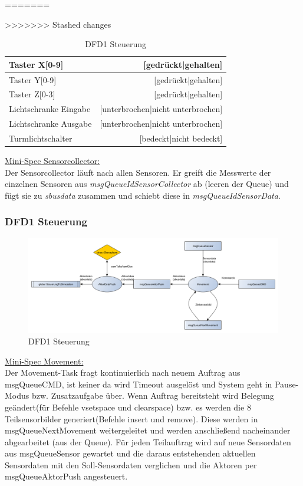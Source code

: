 \begin{table}[h]
=======
\begin{table}[H]
>>>>>>> Stashed changes
\centering
\begin{tabular}{|l|r|}
\hline
Taster X[0-9] &  [gedrückt|gehalten] \\
\hline
Taster Y[0-9] &  [gedrückt|gehalten] \\
\hline
Taster Z[0-3] &  [gedrückt|gehalten] \\
\hline
Lichtschranke Eingabe & [unterbrochen|nicht unterbrochen] \\
\hline
Lichtschranke Ausgabe & [unterbrochen|nicht unterbrochen] \\
\hline
Turmlichtschalter & [bedeckt|nicht bedeckt]\\
\hline
\end{tabular}
\caption{Requirements Dictionary: Die Stati der Sensoren}
\label{tab:Requirements Dictionary}
\end{table}


\underline{Mini-Spec Sensorcollector:}\\
Der Sensorcollector läuft nach allen Sensoren. Er  greift die Messwerte der einzelnen Sensoren aus \textit{msgQueueIdSensorCollector} ab (leeren der Queue) und fügt sie zu \textit{sbusdata} zusammen und schiebt diese in \textit{msgQueueIdSensorData}.\\ 


\subsubsection{DFD1 Steuerung}
\begin{figure}[H]
	\centering
  \includegraphics[width=\textwidth]{DFD/dfd1_steuerung.png}
	\caption{DFD1 Steuerung}
	\label{fig3}
\end{figure}

\underline{Mini-Spec Movement:}\\
Der Movement-Task fragt kontinuierlich nach neuem Auftrag aus msgQueueCMD, ist keiner da wird Timeout ausgelöst und System geht in Pause-Modus bzw. Zusatzaufgabe über. Wenn Auftrag bereitsteht wird Belegung geändert(für Befehle vsetspace und clearspace) bzw. es werden die 8 Teilsensorbilder generiert(Befehle insert und remove). Diese werden in msgQueueNextMovement weitergeleitet und werden anschließend nacheinander abgearbeitet (aus der Queue). Für jeden Teilauftrag wird auf neue Sensordaten aus msgQueueSensor gewartet und die daraus entstehenden aktuellen Sensordaten mit den Soll-Sensordaten verglichen und die Aktoren per msgQueueAktorPush angesteuert. \\


\end{table}
